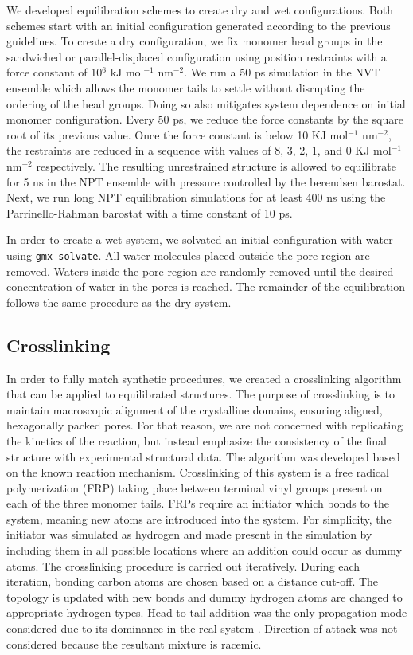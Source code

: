 \documentclass{article}
\begin{document}
  We developed equilibration schemes to create dry and wet configurations. Both
  schemes start with an initial configuration generated according to the previous
  guidelines. To create a dry configuration, we fix monomer head groups in the
  sandwiched or parallel-displaced configuration using position restraints with a
  force constant of 10$^6$ kJ mol$^{-1}$ nm$^{-2}$. We run a 50 ps simulation in
  the NVT ensemble which allows the monomer tails to settle without disrupting
  the ordering of the head groups. Doing so also mitigates system dependence on
  initial monomer configuration. Every 50 ps, we reduce the force constants by
  the square root of its previous value. Once the force constant is below 10 KJ
  mol$^{-1}$ nm$^{-2}$, the restraints are reduced in a sequence with values of
  8, 3, 2, 1, and 0 KJ mol$^{-1}$ nm$^{-2}$ respectively. The resulting
  unrestrained structure is allowed to equilibrate for 5 ns in the NPT ensemble
  with pressure controlled by the berendsen barostat. Next, we run long NPT
  equilibration simulations for at least 400 ns using the Parrinello-Rahman
  barostat with a time constant of 10 ps.

  In order to create a wet system, we solvated an initial configuration with
  water using \texttt{gmx solvate}. All water molecules placed outside the pore
  region are removed. Waters inside the pore region are randomly removed until
  the desired concentration of water in the pores is reached. The remainder of
  the equilibration follows the same procedure as the dry system. 

  \subsection{Crosslinking}
  
  In order to fully match synthetic procedures, we created a crosslinking
  algorithm that can be applied to equilibrated structures. The purpose of
  crosslinking is to maintain macroscopic alignment of the crystalline domains,
  ensuring aligned, hexagonally packed pores. For that reason, we are not
  concerned with replicating the kinetics of the reaction, but instead emphasize
  the consistency of the final structure with experimental structural data. The
  algorithm was developed based on the known reaction mechanism. Crosslinking of
  this system is a free radical polymerization (FRP) taking place between
  terminal vinyl groups present on each of the three monomer tails. FRPs require
  an initiator which bonds to the system, meaning new atoms are introduced into
  the system. For simplicity, the initiator was simulated as hydrogen and made
  present in the simulation by including them in all possible locations where an
  addition could occur as dummy atoms. The crosslinking procedure is carried out
  iteratively. During each iteration, bonding carbon atoms are chosen based on a
  distance cut-off. The topology is updated with new bonds and dummy hydrogen
  atoms are changed to appropriate hydrogen types. Head-to-tail addition was the
  only propagation mode considered due to its dominance in the real system \cite{young_introduction_2011}.
  Direction of attack was not considered because the resultant mixture is
  racemic.
\end{document}
